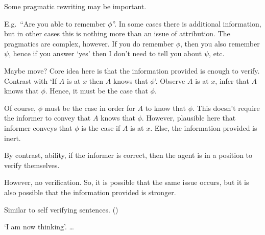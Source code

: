 \documentclass[10pt]{article}
\begin{document}
\begin{note}[Pragmatics]
    Some pragmatic rewriting may be important.

  E.g.\ ``Are you able to remember \(\phi\)''.
  In some cases there is additional information, but in other cases this is nothing more than an issue of attribution.
  The pragmatics are complex, however.
  If you do remember \(\phi\), then you also remember \(\psi\), hence if you answer `yes' then I don't need to tell you about \(\psi\), etc.
\end{note}

\begin{note}
  {
    \color{red}
    Maybe move?
  }
  Core idea here is that the information provided is enough to verify.
  Contrast with `If \(A\) is at \(x\) then \(A\) knows that \(\phi\)'.
  Observe \(A\) is at \(x\), infer that \(A\) knows that \(\phi\).
  Hence, it must be the case that \(\phi\).

  Of course, \(\phi\) must be the case in order for \(A\) to know that \(\phi\).
  This doesn't require the informer to convey that \(A\) knows that \(\phi\).
  However, plausible here that informer conveys that \(\phi\) is the case if \(A\) is at \(x\).
  Else, the information provided is inert.

  By contrast, ability, if the informer is correct, then the agent is in a position to verify themselves.

  However, no verification.
  So, it is possible that the same issue occurs, but it is also possible that the information provided is stronger.

  Similar to self verifying sentences.
  (\cite{Burge:1988vn})

  `I am now thinking'.
  \dots
\end{note}
\end{document}
